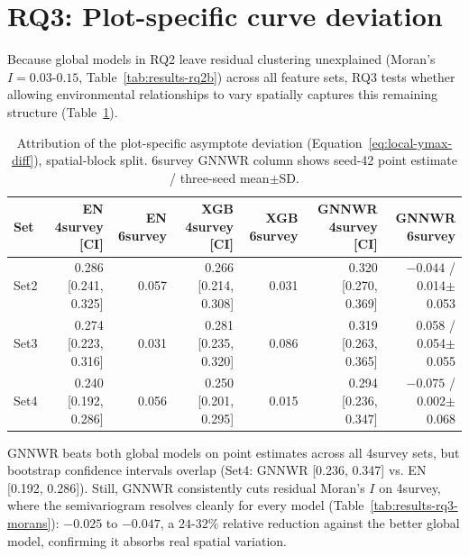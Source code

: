 
\section{RQ3: Plot-specific curve deviation}

Because global models in RQ2 leave residual clustering unexplained (Moran's $I = 0.03\text{-}0.15$, Table~\ref{tab:results-rq2b}) across all feature sets, RQ3 tests whether allowing environmental relationships to vary spatially captures this remaining structure (Table~\ref{tab:results-rq3}).

\begin{table}[!htbp]
\centering
\scriptsize
\setlength{\tabcolsep}{4pt}
\renewcommand{\arraystretch}{1.2}
\begin{tabular}{lrrrrrr}
\toprule
Set & EN 4survey [CI] & EN 6survey & XGB 4survey [CI] & XGB 6survey & GNNWR 4survey [CI] & GNNWR 6survey \\
\midrule
Set2 & 0.286 [0.241, 0.325] & 0.057 & 0.266 [0.214, 0.308] & 0.031 & 0.320 [0.270, 0.369] & $-0.044$ / 0.014$\pm$0.053 \\
Set3 & 0.274 [0.223, 0.316] & 0.031 & 0.281 [0.235, 0.320] & 0.086 & 0.319 [0.263, 0.365] & 0.058 / 0.054$\pm$0.055 \\
Set4 & 0.240 [0.192, 0.286] & 0.056 & 0.250 [0.201, 0.295] & 0.015 & 0.294 [0.236, 0.347] & $-0.075$ / 0.002$\pm$0.068 \\
\bottomrule
\end{tabular}
\caption{Attribution of the plot-specific asymptote deviation
(Equation~\ref{eq:local-ymax-diff}), spatial-block split. 6survey GNNWR column shows
seed-42 point estimate / three-seed mean$\pm$SD.} %
\label{tab:results-rq3}
\end{table}

GNNWR beats both global models on point estimates across all 4survey sets, but bootstrap confidence intervals overlap (Set4: GNNWR [0.236, 0.347] vs. EN [0.192, 0.286]). Still, GNNWR consistently cuts residual Moran's $I$ on 4survey, where the semivariogram resolves cleanly for every model (Table~\ref{tab:results-rq3-morans}): $-0.025$ to $-0.047$, a $24$-$32\%$ relative reduction against the better global model, confirming it absorbs real spatial variation. 


